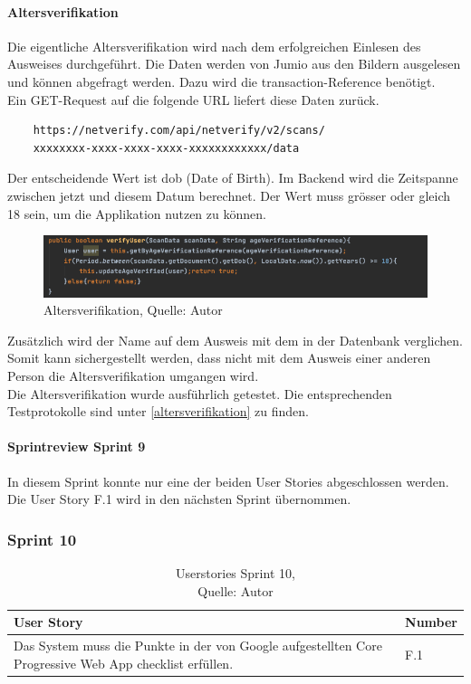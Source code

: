 \paragraph{Altersverifikation}
Die eigentliche Altersverifikation wird nach dem erfolgreichen Einlesen des Ausweises durchgeführt. Die Daten werden von Jumio aus den Bildern ausgelesen und können abgefragt werden. Dazu wird die transaction-Reference benötigt. \\
Ein GET-Request auf die folgende URL liefert diese Daten zurück. 
\begin{verbatim}
	https://netverify.com/api/netverify/v2/scans/
	xxxxxxxx-xxxx-xxxx-xxxx-xxxxxxxxxxxx/data
\end{verbatim}
Der entscheidende Wert ist dob (Date of Birth). Im Backend wird die Zeitspanne zwischen jetzt und diesem Datum berechnet. Der Wert muss grösser oder gleich 18 sein, um die Applikation nutzen zu können. 
 \begin{figure}[H]
	\centering
	\includegraphics[width=1\textwidth]{images/dob.PNG}
	\caption[Altersverifikation]{Altersverifikation, Quelle: Autor}
	\label{img: dob}
\end{figure} 

Zusätzlich wird der Name auf dem Ausweis mit dem in der Datenbank verglichen. Somit kann sichergestellt werden, dass nicht mit dem Ausweis einer anderen Person die Altersverifikation umgangen wird. \\
Die Altersverifikation wurde ausführlich getestet. Die entsprechenden Testprotokolle sind unter \ref{altersverifikation} zu finden. 

\paragraph{Sprintreview Sprint 9}
In diesem Sprint konnte nur eine der beiden User Stories abgeschlossen werden. Die \gls{User Story} F.1 wird in den nächsten Sprint übernommen. 

\subsubsection{Sprint 10}
\begin{table}[H]
	\setlength\extrarowheight{2pt} %
	\begin{tabularx}{\textwidth}{|X|l|}
		\hline
		\textbf{User Story} & \textbf{Number} \\
		\hline
		Das System muss die Punkte in der von Google aufgestellten Core Progressive Web App checklist erfüllen. & F.1\\
		\hline
		
		\hline
	\end{tabularx} 
	\caption[Userstories Sprint 10]{Userstories Sprint 10,\\ Quelle: Autor}
\end{table}\label{userStoriesSprint10}
